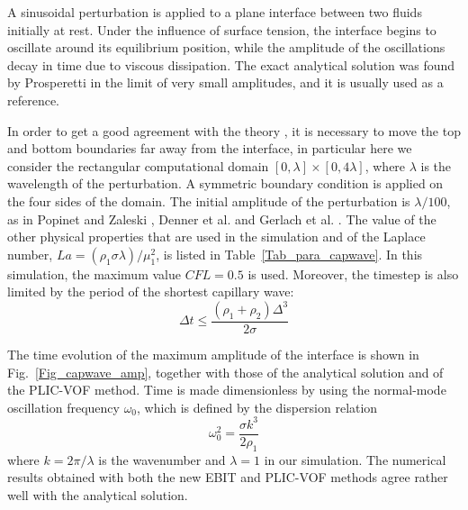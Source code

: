 A sinusoidal perturbation is applied to a plane interface between two fluids initially at rest. Under the influence of surface tension, the interface begins to oscillate around its equilibrium position, while the amplitude of the oscillations decay in time due to viscous dissipation. The exact analytical solution was found by Prosperetti \cite{Prosperetti_1981_24} in the limit of very small amplitudes, and it is usually used as a reference.

In order to get a good agreement with the theory \cite{Popinet_2009_228}, it is necessary to move the top and bottom boundaries far away from the interface, in particular here we consider the rectangular computational domain $[0, \lambda] \times [0, 4 \lambda]$, where $\lambda$ is the wavelength of the perturbation. A symmetric boundary condition is applied on the four sides of the domain. The initial amplitude of the perturbation is 
$\lambda/100$, as in Popinet and Zaleski \cite{Popinet_1999_30}, Denner et al. \cite{Denner_2017_226} and Gerlach et al. \cite{Gerlach_2006_49}. The value of the other physical properties that are used in the simulation and of the Laplace number, 
$La = (\rho_1 \sigma \lambda) \big/ \mu_1^2$, is listed in Table~\ref{Tab_para_capwave}.
In this simulation, the maximum value $CFL = 0.5$ is used. Moreover, the timestep is also limited by the period of the shortest capillary wave:
\begin{equation}
\Delta t \leq \frac{(\rho_1 + \rho_2) \Delta^3}{2 \sigma}
\label{Eq_dt_cap}
\end{equation}

The time evolution of the maximum amplitude of the interface is shown in Fig.~\ref{Fig_capwave_amp}, together with those of the analytical solution and of the PLIC-VOF method. Time is made dimensionless by using the normal-mode oscillation frequency $\omega_0$, which is defined by the dispersion relation
\begin{equation}
\omega_0^2 = \frac{\sigma k^3}{2 \rho_1}
\end{equation}
where $k = 2\pi / \lambda$ is the wavenumber and $\lambda = 1$ in our simulation. The numerical results obtained with both the new EBIT and PLIC-VOF methods agree rather well with the analytical solution.

